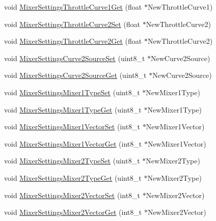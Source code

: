 \begin{DoxyCompactItemize}
\item 
void \hyperlink{group___mixer_settings_ga45292a5c0fb3d02b239cc8043ad8125a}{\-Mixer\-Settings\-Throttle\-Curve1\-Get} (float $\ast$\-New\-Throttle\-Curve1)
\item 
void \hyperlink{group___mixer_settings_ga47591b5367923275ddcea2cfa1da21f6}{\-Mixer\-Settings\-Throttle\-Curve2\-Set} (float $\ast$\-New\-Throttle\-Curve2)
\item 
void \hyperlink{group___mixer_settings_gaacf53141909d8b1473452df48623ac8c}{\-Mixer\-Settings\-Throttle\-Curve2\-Get} (float $\ast$\-New\-Throttle\-Curve2)
\item 
void \hyperlink{group___mixer_settings_ga17a6bf11e321ca4ac17702c582fb1ac2}{\-Mixer\-Settings\-Curve2\-Source\-Set} (uint8\-\_\-t $\ast$\-New\-Curve2\-Source)
\item 
void \hyperlink{group___mixer_settings_ga58e9e1a623a00bd6cf302db6a2b01f81}{\-Mixer\-Settings\-Curve2\-Source\-Get} (uint8\-\_\-t $\ast$\-New\-Curve2\-Source)
\item 
void \hyperlink{group___mixer_settings_ga6c0bb7090a9b318a30fd502957dba1dc}{\-Mixer\-Settings\-Mixer1\-Type\-Set} (uint8\-\_\-t $\ast$\-New\-Mixer1\-Type)
\item 
void \hyperlink{group___mixer_settings_gac7ea3198733bd066b9d459545691170a}{\-Mixer\-Settings\-Mixer1\-Type\-Get} (uint8\-\_\-t $\ast$\-New\-Mixer1\-Type)
\item 
void \hyperlink{group___mixer_settings_gaf33e50d2d5f0f065352341eee3d2240b}{\-Mixer\-Settings\-Mixer1\-Vector\-Set} (int8\-\_\-t $\ast$\-New\-Mixer1\-Vector)
\item 
void \hyperlink{group___mixer_settings_gacf9c1f7165006e96a43072097ec8b1e0}{\-Mixer\-Settings\-Mixer1\-Vector\-Get} (int8\-\_\-t $\ast$\-New\-Mixer1\-Vector)
\item 
void \hyperlink{group___mixer_settings_gae3cdea968a82fbf2625936978d36b04b}{\-Mixer\-Settings\-Mixer2\-Type\-Set} (uint8\-\_\-t $\ast$\-New\-Mixer2\-Type)
\item 
void \hyperlink{group___mixer_settings_gad8386dd28a49c7ead4a2daaeeea6d94d}{\-Mixer\-Settings\-Mixer2\-Type\-Get} (uint8\-\_\-t $\ast$\-New\-Mixer2\-Type)
\item 
void \hyperlink{group___mixer_settings_ga0127fe334bd93b9f17add0133c3063f7}{\-Mixer\-Settings\-Mixer2\-Vector\-Set} (int8\-\_\-t $\ast$\-New\-Mixer2\-Vector)
\item 
void \hyperlink{group___mixer_settings_ga937747e5d10b04458f37ec4f55df2756}{\-Mixer\-Settings\-Mixer2\-Vector\-Get} (int8\-\_\-t $\ast$\-New\-Mixer2\-Vector)

\end{DoxyCompactItemize}
